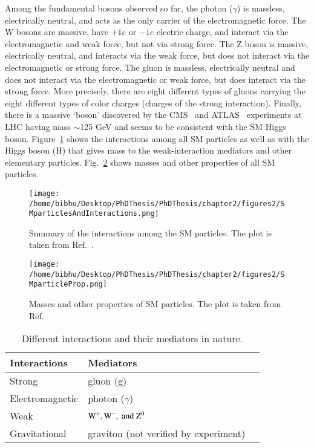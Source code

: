 Among the fundamental bosons observed so far, the photon ($\gamma$) is massless, electrically neutral, and acts as the only carrier of the electromagnetic force. The W bosons are massive, have $+1e$ or $-1e$ electric charge, and interact via the electromagnetic and weak force, but not via strong force. The Z boson is massive, electrically neutral, and interacts via the weak force, but does not interact via the electromagnetic or strong force. The gluon is massless, electrically neutral and does not interact via the electromagnetic or weak force, but does interact via the strong force. More precisely, there are eight different types of gluons carrying the eight different types of color charges (charges of the strong interaction). Finally, there is a massive `boson' discovered by the CMS~\cite{cms-higgs} and ATLAS~\cite{atlas-higgs} experiments at LHC having mass $\sim$125 GeV and seems to be consistent with the SM Higgs boson. Figure~\ref{fig:standard_modelPart} shows the interactions among all SM particles as well as with the Higgs boson (H) that gives mass to the weak-interaction mediators and other elementary particles. Fig.~\ref{fig:SMproperties} shows masses and other properties of all SM particles.
\begin{figure}[h]
    \centering
    \texttt{[image: /home/bibhu/Desktop/PhDThesis/PhDThesis/chapter2/figures2/SMparticlesAndInteractions.png]}
    \caption{\small{Summary of the interactions among the SM particles. The plot is taken from Ref.~\cite{SMandParticles}}.}
    \label{fig:standard_modelPart}
\end{figure}


\begin{figure}[h]
    \centering
    \texttt{[image: /home/bibhu/Desktop/PhDThesis/PhDThesis/chapter2/figures2/SMparticleProp.png]}
    \caption{\small{Masses and other properties of SM particles. The plot is taken from Ref.~\cite{SMandParticles}}}
    \label{fig:SMproperties}
\end{figure}



\begin{table}
\caption{\small{Different interactions and their mediators in nature.}} 
\begin{center}
\begin{tabular}{ | l | l | p{1.5cm}|}
    \hline
     \bf{Interactions} & \bf{Mediators} \\ \hline \hline
     Strong & gluon (g) \\ \hline
     Electromagnetic & photon ($\gamma$) \\ \hline
     Weak & $\rm W^{+}, W^{-}, ~and~ Z^{0}$ \\ \hline 
     Gravitational & graviton (not verified by experiment) \\ \hline
\end {tabular}
\label{Table:Interaction}
\end{center}
\end{table}

